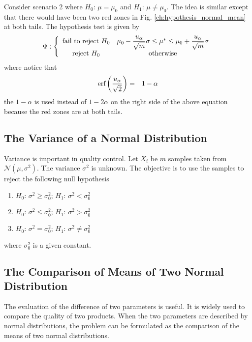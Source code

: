 Consider scenario 2 where $H_0$: $\mu = \mu_0$ and  $H_1$: $\mu \neq \mu_0$. The idea is similar except that there would have been two red zones in Fig. \ref{ch:hypothesis_normal_mean} at both tails. The hypothesis test is given by
\begin{eqnarray}
	\Phi : \left\{\begin{array}{cc}
		\textup{fail to reject~} H_0 & \mu_0 - \dfrac{u_\alpha}{\sqrt{m}}\sigma \leq \mu^* \leq  \mu_0 + \dfrac{u_\alpha}{\sqrt{m}}\sigma \\
		\textup{reject~} H_0 & \textup{otherwise}
	\end{array}\right. \nonumber
\end{eqnarray}
where notice that 
\begin{eqnarray}
	\textup{erf}\left(\dfrac{u_\alpha}{\sqrt{2}}\right) &=& 1-\alpha \nonumber
\end{eqnarray}
the $1-\alpha$ is used instead of $1-2\alpha$ on the right side of the above equation because the red zones are at both tails.

\subsection{The Variance of a Normal Distribution}

Variance is important in quality control. Let $X_i$ be $m$ samples taken from $\mathcal{N}(\mu, \sigma^2)$. The variance $\sigma^2$ is unknown. The objective is to use the samples to reject the following null hypothesis
\begin{enumerate}
	\item $H_0$: $\sigma^2 \geq \sigma_0^2$; $H_1$: $\sigma^2 < \sigma_0^2$
	\item $H_0$: $\sigma^2 \leq \sigma_0^2$; $H_1$: $\sigma^2 > \sigma_0^2$
	\item $H_0$: $\sigma^2 = \sigma_0^2$; $H_1$: $\sigma^2 \neq \sigma_0^2$
\end{enumerate}
where $\sigma_0^2$ is a given constant.

\subsection{The Comparison of Means of Two Normal Distribution}

The evaluation of the difference of two parameters is useful. It is widely used to compare the quality of two products. When the two parameters are described by normal distributions, the problem can be formulated as the comparison of the means of two normal distributions.

